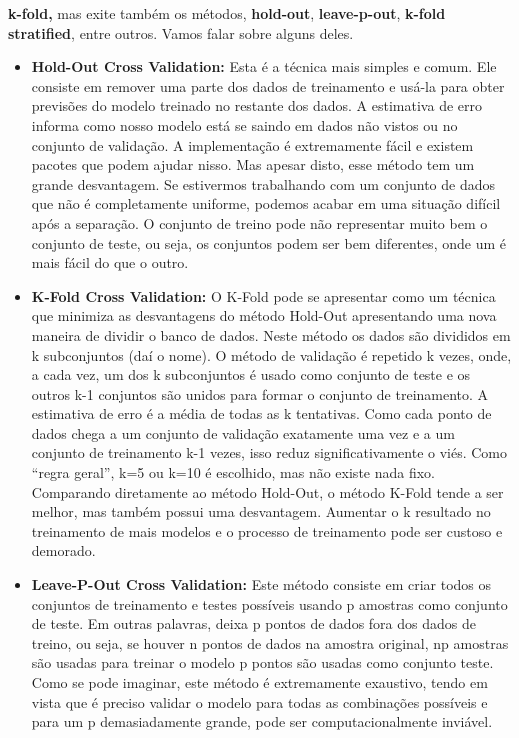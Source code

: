\documentclass[
  letterpaper,
  DIV=11,
  numbers=noendperiod]{scrreprt}
\begin{document}
\textbf{k-fold,} mas exite também os métodos, \textbf{hold-out},
\textbf{leave-p-out}, \textbf{k-fold stratified}, entre outros. Vamos
falar sobre alguns deles.

\begin{itemize}
\item
  \textbf{Hold-Out Cross Validation:} Esta é a técnica mais simples e
  comum. Ele consiste em remover uma parte dos dados de treinamento e
  usá-la para obter previsões do modelo treinado no restante dos dados.
  A estimativa de erro informa como nosso modelo está se saindo em dados
  não vistos ou no conjunto de validação. A implementação é extremamente
  fácil e existem pacotes que podem ajudar nisso. Mas apesar disto, esse
  método tem um grande desvantagem. Se estivermos trabalhando com um
  conjunto de dados que não é completamente uniforme, podemos acabar em
  uma situação difícil após a separação. O conjunto de treino pode não
  representar muito bem o conjunto de teste, ou seja, os conjuntos podem
  ser bem diferentes, onde um é mais fácil do que o outro.
\item
  \textbf{K-Fold Cross Validation:} O K-Fold pode se apresentar como um
  técnica que minimiza as desvantagens do método Hold-Out apresentando
  uma nova maneira de dividir o banco de dados. Neste método os dados
  são divididos em k subconjuntos (daí o nome). O método de validação é
  repetido k vezes, onde, a cada vez, um dos k subconjuntos é usado como
  conjunto de teste e os outros k-1 conjuntos são unidos para formar o
  conjunto de treinamento. A estimativa de erro é a média de todas as k
  tentativas. Como cada ponto de dados chega a um conjunto de validação
  exatamente uma vez e a um conjunto de treinamento k-1 vezes, isso
  reduz significativamente o viés. Como ``regra geral'', k=5 ou k=10 é
  escolhido, mas não existe nada fixo. Comparando diretamente ao método
  Hold-Out, o método K-Fold tende a ser melhor, mas também possui uma
  desvantagem. Aumentar o k resultado no treinamento de mais modelos e o
  processo de treinamento pode ser custoso e demorado.
\item
  \textbf{Leave-P-Out Cross Validation:} Este método consiste em criar
  todos os conjuntos de treinamento e testes possíveis usando p amostras
  como conjunto de teste. Em outras palavras, deixa p pontos de dados
  fora dos dados de treino, ou seja, se houver n pontos de dados na
  amostra original, np amostras são usadas para treinar o modelo p
  pontos são usadas como conjunto teste. Como se pode imaginar, este
  método é extremamente exaustivo, tendo em vista que é preciso validar
  o modelo para todas as combinações possíveis e para um p
  demasiadamente grande, pode ser computacionalmente inviável.
\end{itemize}
\end{document}

